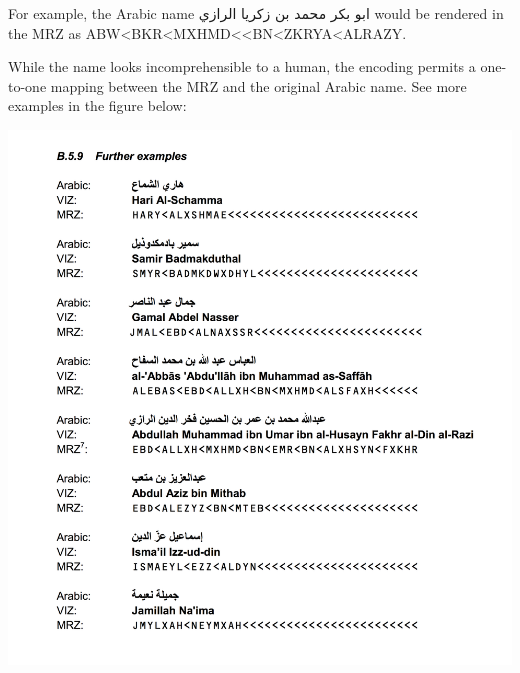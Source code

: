 For example, the Arabic name {\arfont ابو بكر محمد بن زكريا الرازي} would be
rendered in the MRZ as ABW<BKR<MXHMD<<BN<ZKRYA<ALRAZY.

While the name looks incomprehensible to a human, the encoding permits a
one-to-one mapping between the MRZ and the original Arabic name. See more
examples in the figure below:

\includegraphics{subtex/9309.3-appendix-b.5.9.png}
